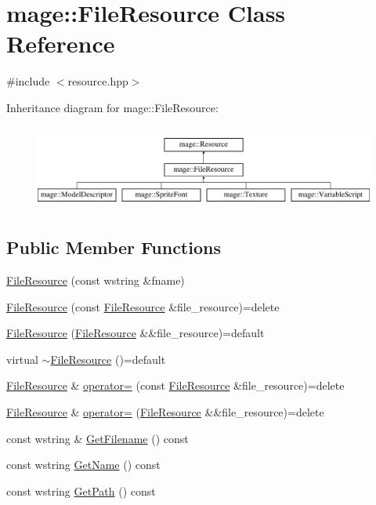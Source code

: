\hypertarget{classmage_1_1_file_resource}{}\section{mage\+:\+:File\+Resource Class Reference}
\label{classmage_1_1_file_resource}


{\ttfamily \#include $<$resource.\+hpp$>$}

Inheritance diagram for mage\+:\+:File\+Resource\+:\begin{figure}[H]
\begin{center}
\leavevmode
\includegraphics[height=2.800000cm]{classmage_1_1_file_resource}
\end{center}
\end{figure}
\subsection*{Public Member Functions}
\begin{DoxyCompactItemize}
\item 
\hyperlink{classmage_1_1_file_resource_ab126d9301d81c55b2aaacff86437e2d4}{File\+Resource} (const wstring \&fname)
\item 
\hyperlink{classmage_1_1_file_resource_a5aa20ee42fcfc4ee6877438ed7377930}{File\+Resource} (const \hyperlink{classmage_1_1_file_resource}{File\+Resource} \&file\+\_\+resource)=delete
\item 
\hyperlink{classmage_1_1_file_resource_a31bf9e2b425e284e2ed65bf18cd7af7b}{File\+Resource} (\hyperlink{classmage_1_1_file_resource}{File\+Resource} \&\&file\+\_\+resource)=default
\item 
virtual \hyperlink{classmage_1_1_file_resource_a91ed639ff33311ebdfb54c80be7d6f62}{$\sim$\+File\+Resource} ()=default
\item 
\hyperlink{classmage_1_1_file_resource}{File\+Resource} \& \hyperlink{classmage_1_1_file_resource_a195da42fa3a40991e7c38cf8305b0bf2}{operator=} (const \hyperlink{classmage_1_1_file_resource}{File\+Resource} \&file\+\_\+resource)=delete
\item 
\hyperlink{classmage_1_1_file_resource}{File\+Resource} \& \hyperlink{classmage_1_1_file_resource_a7ec207d6e9cb0bc4b8020aa73df986b6}{operator=} (\hyperlink{classmage_1_1_file_resource}{File\+Resource} \&\&file\+\_\+resource)=delete
\item 
const wstring \& \hyperlink{classmage_1_1_file_resource_a5930e472973b3e0d9b09dc9d031bacf1}{Get\+Filename} () const
\item 
const wstring \hyperlink{classmage_1_1_file_resource_a8bc3308e018b352157bbcfe3a85519f9}{Get\+Name} () const
\item 
const wstring \hyperlink{classmage_1_1_file_resource_a6dd2da5d50dbe8b3ac4189cdaa5fc325}{Get\+Path} () const
\end{DoxyCompactItemize}



